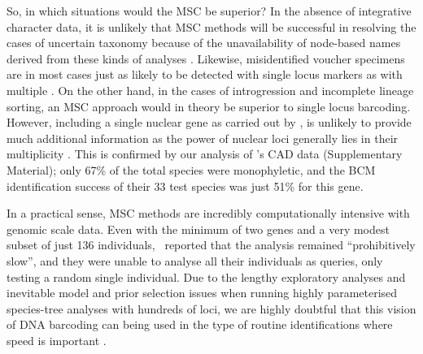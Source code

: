 \documentclass[12pt]{article}
\begin{document}
So, in which situations would the MSC be superior? In the absence of integrative character data, it is unlikely that MSC methods will be successful in resolving the cases of uncertain taxonomy because of the unavailability of node-based names derived from these kinds of analyses \citep{Bauer2010}. Likewise, misidentified voucher specimens are in most cases just as likely to be detected with single locus markers as with multiple \citep{Becker2011,Ko2013}. On the other hand, in the cases of introgression and incomplete lineage sorting, an MSC approach would in theory be superior to single locus barcoding. However, including a single nuclear gene as carried out by \citeauthor{Dowton2014}, is unlikely to provide much additional information as the power of nuclear loci generally lies in their multiplicity \citep{Edwards2009}. This is confirmed by our analysis of \citeauthor{Dowton2014}'s CAD data (Supplementary Material); only 67\% of the total species were monophyletic, and the BCM identification success of their 33 test species was just 51\% for this gene.

In a practical sense, MSC methods are incredibly computationally intensive with genomic scale data. Even with the minimum of two genes and a very modest subset of just 136 individuals, \citeauthor{Dowton2014}\ reported that the analysis remained ``prohibitively slow'', and they were unable to analyse all their individuals as queries, only testing a random single individual. Due to the lengthy exploratory analyses and inevitable model and prior selection issues when running highly parameterised species-tree analyses with hundreds of loci, we are highly doubtful that this vision of DNA barcoding can being used in the type of routine identifications where speed is important \citep{Armstrong2005}. 
\end{document}
